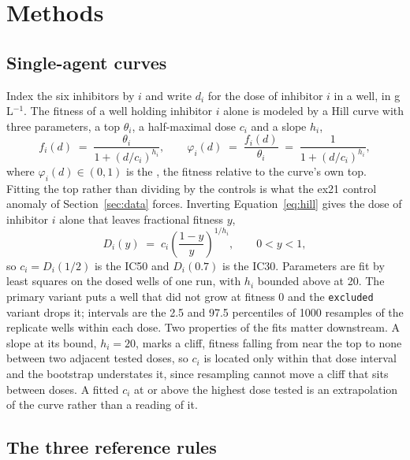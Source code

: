 
\section{Methods}
\label{sec:methods}

\subsection{Single-agent curves}
\label{sec:hill}

Index the six inhibitors by $i$ and write $d_i$ for the dose of inhibitor $i$ in a well,
in g\,L$^{-1}$. The fitness of a well holding inhibitor $i$ alone is modeled by a Hill
curve with three parameters, a top $\theta_i$, a half-maximal dose $c_i$ and a slope
$h_i$,
%
\begin{equation}
  f_i(d) \;=\; \frac{\theta_i}{1 + (d / c_i)^{h_i}} ,
  \qquad
  \varphi_i(d) \;=\; \frac{f_i(d)}{\theta_i} \;=\; \frac{1}{1 + (d / c_i)^{h_i}} ,
  \label{eq:hill}
\end{equation}
%
where $\varphi_i(d) \in (0, 1)$ is the , the fitness relative to
the curve's own top. Fitting the top rather than dividing by the controls is what the
ex21 control anomaly of Section~\ref{sec:data} forces. Inverting
Equation~\ref{eq:hill} gives the dose of inhibitor $i$ alone that leaves fractional
fitness $y$,
%
\begin{equation}
  D_i(y) \;=\; c_i \left( \frac{1 - y}{y} \right)^{1 / h_i} ,
  \qquad 0 < y < 1 ,
  \label{eq:inverse}
\end{equation}
%
so $c_i = D_i(1/2)$ is the IC50 and $D_i(0.7)$ is the IC30. Parameters are fit by least squares on the dosed wells of one run, with $h_i$ bounded
above at 20. The primary variant puts a well that did not grow at fitness 0 and the
\texttt{excluded} variant drops it; intervals are the 2.5 and 97.5 percentiles of 1000
resamples of the replicate wells within each dose. Two properties of the fits matter
downstream. A slope at its bound, $h_i = 20$, marks a cliff, fitness falling from near
the top to none between two adjacent tested doses, so $c_i$ is located only within that
dose interval and the bootstrap understates it, since resampling cannot move a cliff that
sits between doses. A fitted $c_i$ at or above the highest dose tested is an
extrapolation of the curve rather than a reading of it.

\subsection{The three reference rules}
\label{sec:rules}


